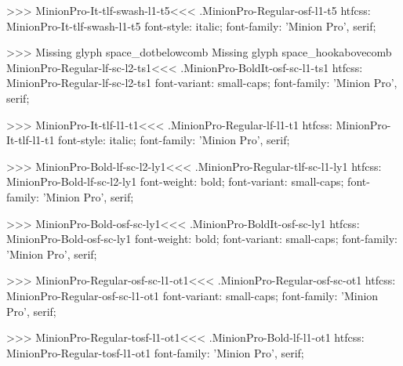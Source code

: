 {>>>
\<MinionPro-It-tlf-swash-l1-t5\><<<
.MinionPro-Regular-osf-l1-t5
htfcss:  MinionPro-It-tlf-swash-l1-t5  font-style: italic; font-family: 'Minion Pro', serif;

>>>
Missing glyph	space_dotbelowcomb
Missing glyph	space_hookabovecomb
\<MinionPro-Regular-lf-sc-l2-ts1\><<<
.MinionPro-BoldIt-osf-sc-l1-ts1
htfcss:  MinionPro-Regular-lf-sc-l2-ts1  font-variant: small-caps; font-family: 'Minion Pro', serif;

>>>
\<MinionPro-It-tlf-l1-t1\><<<
.MinionPro-Regular-lf-l1-t1
htfcss:  MinionPro-It-tlf-l1-t1  font-style: italic; font-family: 'Minion Pro', serif;

>>>
\<MinionPro-Bold-lf-sc-l2-ly1\><<<
.MinionPro-Regular-tlf-sc-l1-ly1
htfcss:  MinionPro-Bold-lf-sc-l2-ly1  font-weight: bold; font-variant: small-caps; font-family: 'Minion Pro', serif;

>>>
\<MinionPro-Bold-osf-sc-ly1\><<<
.MinionPro-BoldIt-osf-sc-ly1
htfcss:  MinionPro-Bold-osf-sc-ly1  font-weight: bold; font-variant: small-caps; font-family: 'Minion Pro', serif;

>>>
\<MinionPro-Regular-osf-sc-l1-ot1\><<<
.MinionPro-Regular-osf-sc-ot1
htfcss:  MinionPro-Regular-osf-sc-l1-ot1  font-variant: small-caps; font-family: 'Minion Pro', serif;

>>>
\<MinionPro-Regular-tosf-l1-ot1\><<<
.MinionPro-Bold-lf-l1-ot1
htfcss:  MinionPro-Regular-tosf-l1-ot1  font-family: 'Minion Pro', serif;

}
